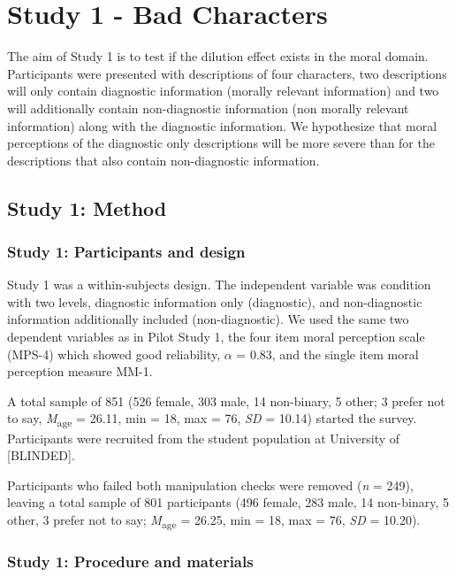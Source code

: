 \documentclass[
  man,floatsintext]{apa7}
\begin{document}
\section{Study 1 - Bad Characters}\label{study-1---bad-characters}

The aim of Study 1 is to test if the dilution effect exists in the moral domain. Participants were presented with descriptions of four characters, two descriptions will only contain diagnostic information (morally relevant information) and two will additionally contain non-diagnostic information (non morally relevant information) along with the diagnostic information. We hypothesize that moral perceptions of the diagnostic only descriptions will be more severe than for the descriptions that also contain non-diagnostic information.

\subsection{Study 1: Method}\label{study-1-method}

\subsubsection{Study 1: Participants and design}\label{study-1-participants-and-design}

Study 1 was a within-subjects design. The independent variable was condition with two levels, diagnostic information only (diagnostic), and non-diagnostic information additionally included (non-diagnostic). We used the same two dependent variables as in Pilot Study 1, the four item moral perception scale (MPS-4) which showed good reliability, \(\alpha\) = 0.83, and the single item moral perception measure MM-1.

A total sample of 851 (526 female, 303 male, 14 non-binary, 5 other; 3 prefer not to say, \emph{M}\textsubscript{age} = 26.11, min = 18, max = 76, \emph{SD} = 10.14) started the survey. Participants were recruited from the student population at University of {[}BLINDED{]}.

Participants who failed both manipulation checks were removed (\emph{n} = 249), leaving a total sample of 801 participants (496 female, 283 male, 14 non-binary, 5 other, 3 prefer not to say; \emph{M}\textsubscript{age} = 26.25, min = 18, max = 76, \emph{SD} = 10.20).

\subsubsection{Study 1: Procedure and materials}\label{study-1-procedure-and-materials}
\end{document}
